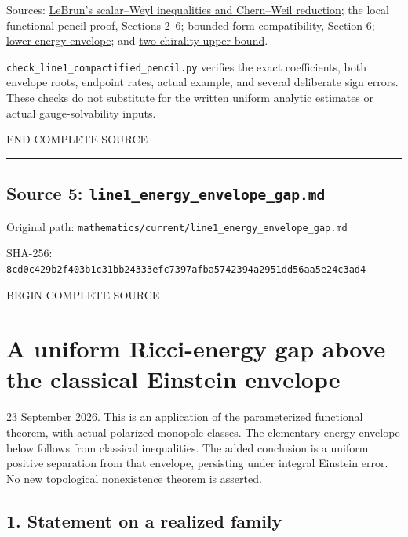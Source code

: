 \documentclass[
  10pt,
]{article}
\begin{document}
Sources: \href{https://arxiv.org/abs/math/0003068}{LeBrun's scalar--Weyl
inequalities and Chern--Weil reduction}; the local
\href{line1_functional_pencil.md}{functional-pencil proof}, Sections
2--6; \href{round21_analytic.md}{bounded-form compatibility}, Section 6;
\href{line1_energy_envelope_gap.md}{lower energy envelope}; and
\href{line1_two_chirality_topology.md}{two-chirality upper bound}.

\nolinkurl{check_line1_compactified_pencil.py} verifies the exact
coefficients, both envelope roots, endpoint rates, actual example, and
several deliberate sign errors. These checks do not substitute for the
written uniform analytic estimates or actual gauge-solvability inputs.

END COMPLETE SOURCE

\begin{center}\rule{0.5\linewidth}{0.5pt}\end{center}

\hypertarget{source-5-line1_energy_envelope_gap.md}{%
\subsection{Source 5:
\nolinkurl{line1_energy_envelope_gap.md}}\label{source-5-line1_energy_envelope_gap.md}}

Original path:
\nolinkurl{mathematics/current/line1_energy_envelope_gap.md}

SHA-256:
\nolinkurl{8cd0c429b2f403b1c31bb24333efc7397afba5742394a2951dd56aa5e24c3ad4}

BEGIN COMPLETE SOURCE

\hypertarget{a-uniform-ricci-energy-gap-above-the-classical-einstein-envelope}{%
\section{A uniform Ricci-energy gap above the classical Einstein
envelope}\label{a-uniform-ricci-energy-gap-above-the-classical-einstein-envelope}}

23 September 2026. This is an application of the parameterized
functional theorem, with actual polarized monopole classes. The
elementary energy envelope below follows from classical inequalities.
The added conclusion is a uniform positive separation from that
envelope, persisting under integral Einstein error. No new topological
nonexistence theorem is asserted.

\hypertarget{statement-on-a-realized-family}{%
\subsection{1. Statement on a realized
family}\label{statement-on-a-realized-family}}
\end{document}

